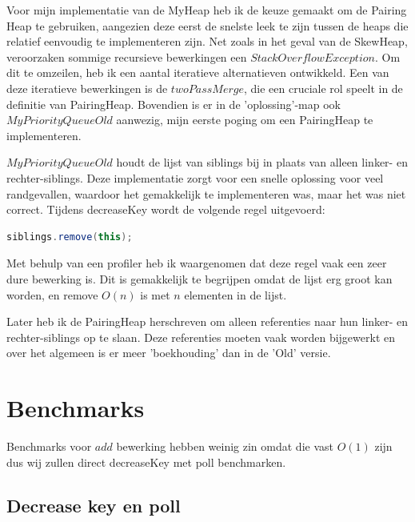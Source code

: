 \documentclass[12pt,a4paper,fleqn]{report}
\begin{document}
	Voor mijn implementatie van de MyHeap heb ik de keuze gemaakt om de Pairing Heap te gebruiken, aangezien deze eerst de snelste leek te zijn tussen de heaps die relatief eenvoudig te implementeren zijn. Net zoals in het geval van de SkewHeap, veroorzaken sommige recursieve bewerkingen een $StackOverflowException$. Om dit te omzeilen, heb ik een aantal iteratieve alternatieven ontwikkeld. Een van deze iteratieve bewerkingen is de $twoPassMerge$, die een cruciale rol speelt in de definitie van PairingHeap. Bovendien is er in de 'oplossing'-map ook $MyPriorityQueueOld$ aanwezig, mijn eerste poging om een PairingHeap te implementeren.

	$MyPriorityQueueOld$ houdt de lijst van siblings bij in plaats van alleen
	linker- en rechter-siblings. Deze implementatie zorgt voor een snelle oplossing voor veel randgevallen, waardoor het gemakkelijk te implementeren was, maar het was niet correct. Tijdens \textsf{decreaseKey} wordt de volgende regel uitgevoerd:
	\begin{lstlisting}[language=Java]
		siblings.remove(this);
\end{lstlisting}

	Met behulp van een profiler heb ik waargenomen dat deze regel vaak een zeer dure bewerking is. Dit is gemakkelijk te begrijpen omdat de lijst erg groot kan worden, en remove $O(n)$ is met $n$ elementen in de lijst.

	Later heb ik de PairingHeap herschreven om alleen referenties naar hun linker- en rechter-siblings op te slaan. Deze referenties moeten vaak worden bijgewerkt en over het algemeen is er meer 'boekhouding' dan in de 'Old' versie.


	\section{Benchmarks}

	Benchmarks voor $add$ bewerking hebben weinig zin omdat die vast $O(1)$ zijn dus wij
	zullen direct \textsf{decreaseKey} met \textsf{poll} benchmarken.
\pagebreak
	\subsection{Decrease key en poll}
\end{document}
